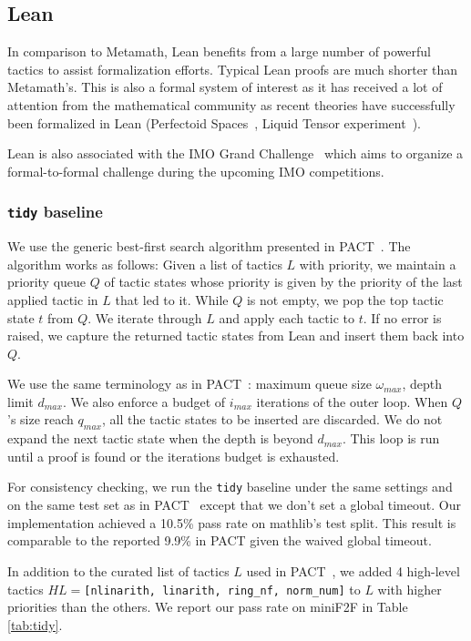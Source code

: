 \subsection{Lean}

In comparison to Metamath, Lean benefits from a large number of powerful tactics to assist formalization efforts. Typical Lean proofs are much shorter than Metamath's. This is also a formal system of interest as it has received a lot of attention from the mathematical community as recent theories have successfully been formalized in Lean (Perfectoid Spaces~\citep{perfectoidspaces}, Liquid Tensor experiment~\citep{liquidtensor}).

Lean is also associated with the IMO Grand Challenge~\citep{imograndchallenge} which aims to organize a formal-to-formal challenge during the upcoming IMO competitions.

\subsubsection{\texttt{tidy} baseline}
\label{subsection:tidy}

We use the generic best-first search algorithm presented in PACT~\citep{han2021proof}. The algorithm works as follows: Given a list of tactics $L$ with priority, we maintain a priority queue $Q$ of tactic states whose priority is given by the priority of the last applied tactic in $L$ that led to it. While $Q$ is not empty, we pop the top tactic state $t$ from $Q$. We iterate through $L$ and apply each tactic to $t$. If no error is raised, we capture the returned tactic states from Lean and insert them back into $Q$.

We use the same terminology as in PACT~\citep{han2021proof}: maximum queue size $\omega_{max}$, depth limit $d_{max}$. We also enforce a budget of $i_{max}$ iterations of the outer loop. When $Q$'s size reach $q_{max}$, all the tactic states to be inserted are discarded. We do not expand the next tactic state when the depth is beyond $d_{max}$. This loop is run until a proof is found or the iterations budget is exhausted.

For consistency checking, we run the \texttt{tidy} baseline under the same settings and on the same test set as in PACT~\citep{han2021proof} except that we don't set a global timeout. Our implementation achieved a 10.5\% pass rate on mathlib's test split. This result is comparable to the reported 9.9\% in PACT given the waived global timeout.

In addition to the curated list of tactics $L$ used in PACT~\citep{han2021proof}, we added 4 high-level tactics $HL=$\texttt{[nlinarith, linarith, ring\_nf, norm\_num]} to $L$ with higher priorities than the others. We report our pass rate on \textsf{miniF2F} in Table \ref{tab:tidy}.

